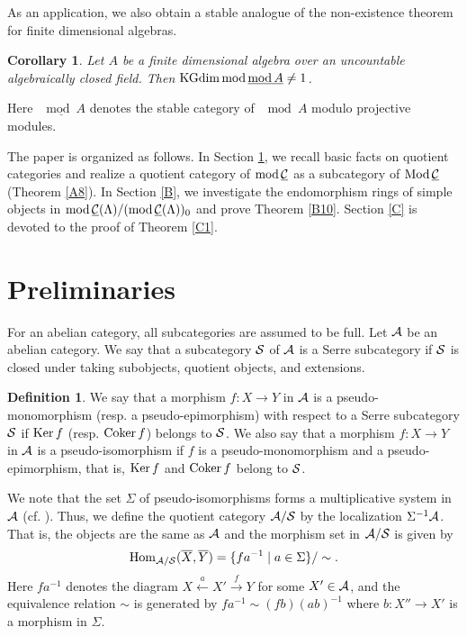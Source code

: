 \documentclass[11pt]{amsart}
\newtheorem{corollary}[theorem]{Corollary}
\theoremstyle{definition}
\newtheorem{definition}[theorem]{Definition}
\numberwithin{equation}{section}
\begin{document}
As an application, we also obtain a stable analogue of the non-existence theorem for finite dimensional algebras.

\begin{corollary}\label{C11_intro}\label{Intro4}
Let $A$ be a finite dimensional algebra over an uncountable algebraically closed field.
Then $\KGdim \mod \underline{\mod A} \neq 1$. 
\end{corollary}

Here $\underline{\mod A}$ denotes the stable category of $\mod A$ modulo projective modules.

The paper is organized as follows.
In Section \ref{A}, we recall basic facts on quotient categories and realize a quotient category of $\modsCC$ as a subcategory of $\ModsCC$ (Theorem \ref{A8}).
In Section \ref{B}, we investigate the endomorphism rings of simple objects in $\modsCML/(\modsCML)_0$ and prove Theorem \ref{B10}.
Section \ref{C} is devoted to the proof of Theorem \ref{C1}. 


\section{Preliminaries}\label{A}

For an abelian category, all subcategories are assumed to be full. 
Let $\AA$ be an abelian category. 
We say that a subcategory $\SS$ of $\AA$ is a Serre subcategory if $\SS$ is closed under taking subobjects, quotient objects, and extensions. 

\begin{definition}\label{A1}
We say that a morphism $f: X \to Y$ in $\AA$ is a pseudo-monomorphism (resp. a pseudo-epimorphism) with respect to a Serre subcategory $\SS$ if $\Ker f$ (resp. $\Coker f$) belongs to $\SS$. 
We also say that a morphism $f: X \to Y$ in $\AA$ is a pseudo-isomorphism if $f$ is a pseudo-monomorphism and a pseudo-epimorphism, that is, $\Ker f$ and $\Coker f$ belong to $\SS$.
\end{definition}

We note that the set $\Sigma$ of pseudo-isomorphisms forms a multiplicative system in $\AA$ (cf. \cite[2.1]{SY18}). 
Thus, we define the quotient category $\AA / \SS$ by the localization $\Sigma^{-1} \AA$. 
That is, the objects are the same as $\AA$ and the morphism set in $\AA / \SS$ is given by 
$$
\HomAS (\overline{X}, \overline{Y}) = \{ f a ^{-1} \mid a \in \Sigma \} / \sim .
$$
Here $f a ^{-1}$ denotes the diagram $X \xleftarrow{a} X' \xrightarrow{f} Y$ for some $X' \in \AA$, and the equivalence relation $\sim$ is generated by $f a^{-1} \sim (fb)(ab)^{-1}$ where $b: X'' \to X'$ is a morphism in $\Sigma$. 
\end{document}
